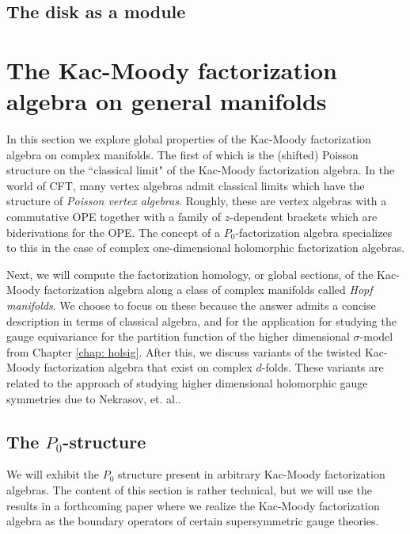 
\subsection{The disk as a module}

\section{The Kac-Moody factorization algebra on general manifolds}

In this section we explore global properties of the Kac-Moody factorization algebra on complex manifolds. 
The first of which is the (shifted) Poisson structure on the ``classical limit" of the Kac-Moody factorization algebra.
In the world of CFT, many vertex algebras admit classical limits which have the structure of {\em Poisson vertex algebras}. 
Roughly, these are vertex algebras with a commutative OPE together with a family of $z$-dependent brackets which are biderivations for the OPE.
The concept of a $P_0$-factorization algebra specializes to this in the case of complex one-dimensional holomorphic factorization algebras. 

Next, we will compute the factorization homology, or global sections, of the Kac-Moody factorization algebra along a class of complex manifolds called {\em Hopf manifolds}.
We choose to focus on these because the answer admits a concise description in terms of classical algebra, and for the application for studying the gauge equivariance for the partition function of the higher dimensional $\sigma$-model from Chapter \ref{chap: holsig}. 
After this, we discuss variants of the twisted Kac-Moody factorization algebra that exist on complex $d$-folds.
These variants are related to the approach of studying higher dimensional holomorphic gauge symmetries due to Nekrasov, et. al..

\subsection{The $P_0$-structure}

We will exhibit the $P_0$ structure present in arbitrary Kac-Moody factorization algebras. 
The content of this section is rather technical, but we will use the results in a forthcoming paper where we realize the Kac-Moody factorization algebra as the boundary operators of certain supersymmetric gauge theories.
 
